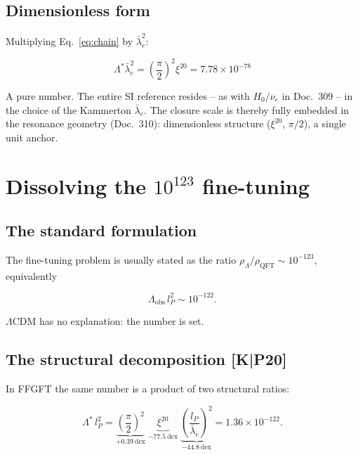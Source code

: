 \documentclass[11pt]{report}
\begin{document}
\section{Dimensionless form}

Multiplying Eq.~\eqref{eq:chain} by $\bar\lambda_e^2$:

\begin{equation}
  \boxed{\;\Lambda^{*}\bar\lambda_e^{2}
  = \left(\frac{\pi}{2}\right)^{2}\xi^{20}
  = 7.78\times10^{-78}\;}
  \label{eq:dimless}
\end{equation}

A pure number. The entire SI reference resides -- as with $H_0/\nu_e$
in Doc.~309 -- in the choice of the Kammerton $\bar\lambda_e$. The
closure scale is thereby fully embedded in the resonance geometry
(Doc.~310): dimensionless structure ($\xi^{20}$, $\pi/2$), a single
unit anchor.

\chapter{Dissolving the $10^{123}$ fine-tuning}

\section{The standard formulation}

The fine-tuning problem is usually stated as the ratio
$\rho_\Lambda/\rho_\text{QFT} \sim 10^{-123}$, equivalently

\[
  \Lambda_\text{obs}\,l_P^{2} \sim 10^{-122}.
\]

$\Lambda$CDM has no explanation: the number is set.

\section{The structural decomposition [K|P20]}

In FFGFT the same number is a product of two structural ratios:

\begin{equation}
  \Lambda^{*}\,l_P^{2}
  = \underbrace{\left(\frac{\pi}{2}\right)^{2}}_{+0.39~\text{dex}}
    \;\underbrace{\xi^{20}}_{-77.5~\text{dex}}
    \;\underbrace{\left(\frac{l_P}{\bar\lambda_e}\right)^{2}}_{-44.8~\text{dex}}
  = 1.36\times10^{-122}.
  \label{eq:decomp}
\end{equation}
\end{document}
